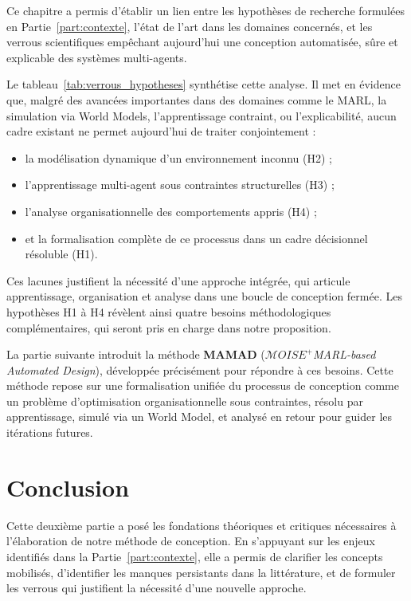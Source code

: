\noindent
Ce chapitre a permis d'établir un lien entre les hypothèses de recherche formulées en Partie~\autoref{part:contexte}, l'état de l'art dans les domaines concernés, et les verrous scientifiques empêchant aujourd'hui une conception automatisée, sûre et explicable des systèmes multi-agents.

\medskip

\noindent
Le tableau~\autoref{tab:verrous_hypotheses} synthétise cette analyse. Il met en évidence que, malgré des avancées importantes dans des domaines comme le \ac{MARL}, la simulation via World Models, l'apprentissage contraint, ou l'explicabilité, aucun cadre existant ne permet aujourd'hui de traiter conjointement :
\begin{itemize}
    \item la modélisation dynamique d'un environnement inconnu (H2) ;
    \item l'apprentissage multi-agent sous contraintes structurelles (H3) ;
    \item l'analyse organisationnelle des comportements appris (H4) ;
    \item et la formalisation complète de ce processus dans un cadre décisionnel résoluble (H1).
\end{itemize}

\noindent
Ces lacunes justifient la nécessité d'une approche intégrée, qui articule apprentissage, organisation et analyse dans une boucle de conception fermée. Les hypothèses H1 à H4 révèlent ainsi quatre besoins méthodologiques complémentaires, qui seront pris en charge dans notre proposition.

\medskip

\noindent
La partie suivante introduit la méthode \textbf{\ac{MAMAD}} (\textit{$\mathcal{M}OISE^+$MARL-based Automated Design}), développée précisément pour répondre à ces besoins. Cette méthode repose sur une formalisation unifiée du processus de conception comme un problème d'optimisation organisationnelle sous contraintes, résolu par apprentissage, simulé via un World Model, et analysé en retour pour guider les itérations futures.





\chapter*{Conclusion}

\noindent
Cette deuxième partie a posé les fondations théoriques et critiques nécessaires à l'élaboration de notre méthode de conception. En s'appuyant sur les enjeux identifiés dans la Partie~\autoref{part:contexte}, elle a permis de clarifier les concepts mobilisés, d'identifier les manques persistants dans la littérature, et de formuler les verrous qui justifient la nécessité d'une nouvelle approche.

